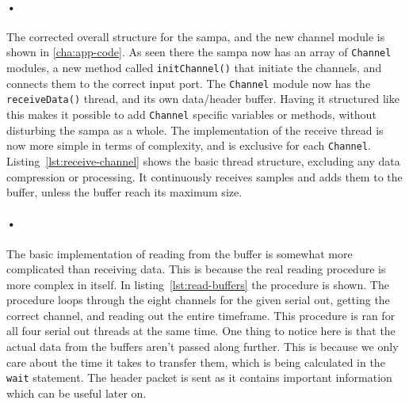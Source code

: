 \documentclass[a4paper, 12pt]{report}
\newcommand{\codeword}[1]{\texttt{#1}}
\begin{document}
\begin{minipage}{\linewidth}

\end{minipage}

\paragraph{•}%
The corrected overall structure for the \gls{sampa}, and the new channel module is shown in \ref{cha:app-code}.
As seen there the \gls{sampa} now has an array of \codeword{Channel} modules, a new method called \codeword{initChannel()} that initiate the channels, and connects them to the correct input port.
The \codeword{Channel} module now has the \codeword{receiveData()} thread, and its own data/header buffer.
Having it structured like this makes it possible to add \codeword{Channel} specific variables or methods, without disturbing the \gls{sampa} as a whole.
The implementation of the receive thread is now more simple in terms of complexity, and is exclusive for each \codeword{Channel}.
Listing~\ref{lst:receive-channel} shows the basic thread structure, excluding any data compression or processing.
It continuously receives samples and adds them to the buffer, unless the buffer reach its maximum size.

\begin{minipage}{\linewidth}

\end{minipage}

\paragraph{•}
The basic implementation of reading from the buffer is somewhat more complicated than receiving data.
This is because the real reading procedure is more complex in itself.
In listing~\ref{lst:read-buffers} the procedure is shown.
The procedure loops through the eight channels for the given serial out, getting the correct channel, and reading out the entire timeframe.
This procedure is ran for all four serial out threads at the same time.
One thing to notice here is that the actual data from the buffers aren't passed along further.
This is because we only care about the time it takes to transfer them, which is being calculated in the \codeword{wait} statement.
The header packet is sent as it contains important information which can be useful later on.
\end{document}
